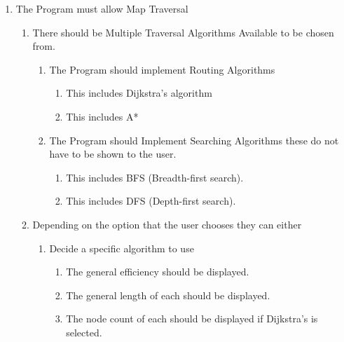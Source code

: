\begin{flushleft}
\begin{enumerate}
            \item The Program must allow Map Traversal
            \begin{enumerate}
                \item There should be Multiple Traversal Algorithms Available to be chosen from.
                    \begin{enumerate}
                        \item The Program should implement Routing Algorithms 
                        \begin{enumerate}
                            \item This includes Dijkstra's algorithm
                            \item This includes A*
                        \end{enumerate}
                        \item The Program should Implement Searching Algorithms these do not have to be shown to the user.
                        \begin{enumerate}
                            \item This includes BFS (Breadth-first search).
                            \item This includes DFS (Depth-first search).
                        \end{enumerate}
                    \end{enumerate}
                \item Depending on the option that the user chooses they can either
                \begin{enumerate}
                    \item Decide a specific algorithm to use
                    \begin{enumerate}
                        \item The general efficiency should be displayed.
                        \item The general length of each should be displayed.
                        \item The node count of each should be displayed if Dijkstra's is selected.
                    \end{enumerate}
                \end{enumerate}
            \end{enumerate}
            

\end{enumerate}
\end{flushleft}
